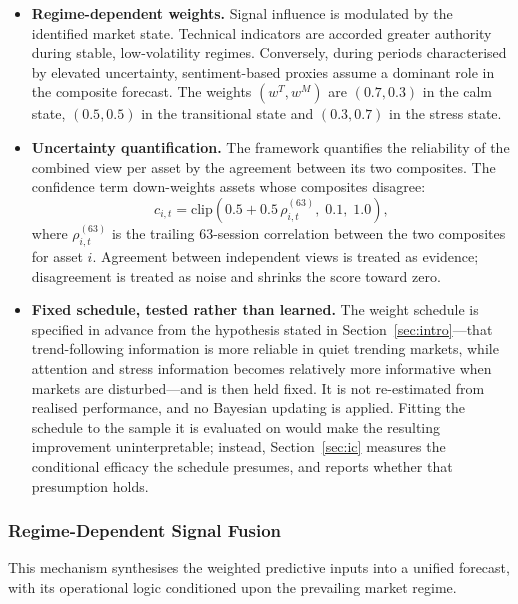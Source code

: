 \documentclass{singlecol-new}
\theoremstyle{TH}{
\newtheorem{lemma}{Lemma}
\newtheorem{theorem}[lemma]{Theorem}
\newtheorem{corrolary}[lemma]{Corrolary}
\newtheorem{conjecture}[lemma]{Conjecture}
\newtheorem{proposition}[lemma]{Proposition}
\newtheorem{claim}[lemma]{Claim}
\newtheorem{stheorem}[lemma]{Wrong Theorem}
\newtheorem{algorithm}{Algorithm}
}
\theoremstyle{THrm}{
\newtheorem{definition}{Definition}[section]
\newtheorem{question}{Question}[section]
\newtheorem{remark}{Remark}
\newtheorem{scheme}{Scheme}
}
\theoremstyle{THhit}{
\newtheorem{case}{Case}[section]
}
\begin{document}
\begin{itemize}
\item \textbf{Regime-dependent weights.} Signal influence is modulated by the identified
market state. Technical indicators are accorded greater authority during stable,
low-volatility regimes. Conversely, during periods characterised by elevated uncertainty,
sentiment-based proxies assume a dominant role in the composite forecast. The weights
$(w^T, w^M)$ are
$(0.7, 0.3)$ in the calm state, $(0.5, 0.5)$ in the transitional state and $(0.3, 0.7)$
in the stress state.
\item \textbf{Uncertainty quantification.} The framework quantifies the reliability of
the combined view per asset by the agreement between its two composites. The confidence
term down-weights assets whose composites disagree:
\begin{equation}
c_{i,t} = \mathrm{clip}\!\left(0.5 + 0.5\,\rho^{(63)}_{i,t}, \; 0.1, \; 1.0\right),
\end{equation}
where $\rho^{(63)}_{i,t}$ is the trailing 63-session correlation between the two
composites for asset $i$. Agreement between independent views is treated as evidence;
disagreement is treated as noise and shrinks the score toward zero.
\item \textbf{Fixed schedule, tested rather than learned.} The weight schedule is
specified in advance from the hypothesis stated in Section~\ref{sec:intro}---that
trend-following information is more reliable in quiet trending markets, while attention
and stress information becomes relatively more informative when markets are
disturbed---and is then held fixed. It is not re-estimated from realised performance, and
no Bayesian updating is applied. Fitting the schedule to the sample it is evaluated on
would make the resulting improvement uninterpretable; instead,
Section~\ref{sec:ic} measures the conditional efficacy the schedule presumes, and reports
whether that presumption holds.
\end{itemize}

\subsubsection{Regime-Dependent Signal Fusion}

This mechanism synthesises the weighted predictive inputs into a unified forecast, with
its operational logic conditioned upon the prevailing market regime.
\end{document}
